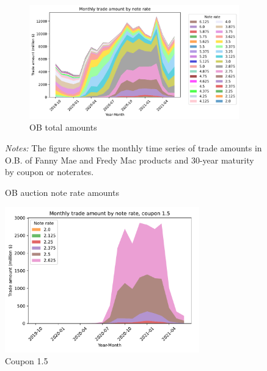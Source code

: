 \documentclass[11pt,a4paper]{article}
\begin{document}

\pagebreak
\begin{figure}[h]
  \centering
   \begin{subfigure}[b]{0.85\textwidth}
    \includegraphics[width=0.998\textwidth]{../results/figures/ob_monthly_trade_amount_by_noterate_all_area_legend_colors.pdf}
    \caption{OB total amounts}
   \end{subfigure}
   \caption{OB auction note rate amounts} 
   \begin{minipage}{\textwidth}
    \footnotesize{\textit{Notes:} The figure shows the monthly time series of trade amounts in O.B. of Fanny Mae and Fredy Mac products and 30-year maturity by coupon or noterates. } 
      \end{minipage}
\end{figure}


\begin{figure}[h]
  \includegraphics[width=0.75\textwidth]{../results/figures/ob_monthly_trade_amount_by_noterate_c15.0_area_legend_colors_left.pdf}
  \caption{Coupon 1.5}
  \end{figure}
\end{document}
